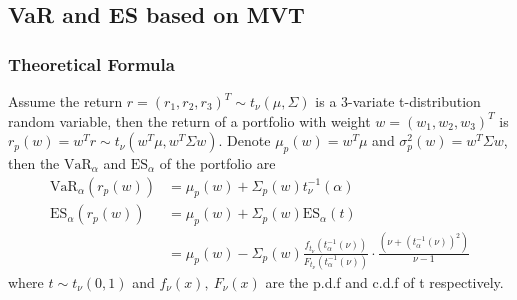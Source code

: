 \subsection{VaR and ES based on MVT}
\subsubsection{Theoretical Formula}
Assume the return $r=(r_1,r_2,r_3)^T \sim t_{\nu}(\mu,\Sigma)$ is a 3-variate t-distribution random variable, then the return of a portfolio with weight $w=(w_1,w_2,w_3)^T$ is $r_p(w)=w^Tr \sim t_{\nu}(w^T\mu,w^T\Sigma w)$. Denote $\mu_p(w)=w^T\mu$ and $\sigma_p^2(w)=w^T\Sigma w$, then the $\text{VaR}_{\alpha}$ and $\text{ES}_{\alpha}$ of the portfolio are
\begin{equation} \label{E2.3}
\begin{aligned}
\text{VaR}_{\alpha}\left(r_p(w)\right) &= \mu_p(w) +\Sigma_p(w) t_{\nu}^{-1}(\alpha)    \\
\text{ES}_{\alpha}\left(r_p(w)\right) &= \mu_p(w) +\Sigma_p(w) \text{ES}_{\alpha}\left(t\right) \\
&=\mu_p(w) -\Sigma_p(w) \frac{f_{t_{\nu}}\left(t^{-1}_\alpha(\nu)\right)}{F_{t_{\nu}}\left(t^{-1}_\alpha(\nu)\right)} \cdot \frac{\left(\nu+(t^{-1}_\alpha(\nu))^2\right)}{\nu-1}
\end{aligned}
\end{equation}
where $t \sim t_{\nu}(0,1)$ and $f_{\nu}(x),\:F_{\nu}(x)$ are the p.d.f and c.d.f of t respectively.

